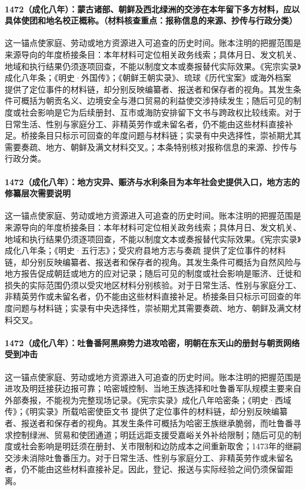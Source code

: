 \paragraph{1472（成化八年）：蒙古诸部、朝鲜及西北绿洲的交涉在本年留下多方材料，应以具体使团和地名校正概称。（材料核查重点：报称信息的来源、抄传与行政分类）} 这一锚点使家庭、劳动或地方资源进入可追查的历史时间。账本注明的把握范围是来源导向的年度桥接条目：本年材料可定位相关政务线索；具体月日、发文机关、地域和执行结果仍须逐项回查，不能以制度文本或奏报替代实际效果。《宪宗实录》成化八年条；《明史·外国传》；《朝鲜王朝实录》、琉球《历代宝案》或海外档案 提供了定位事件的材料链，却分别反映编纂者、报送者和保存者的视角。其发生条件可概括为朝贡名义、边境安全与港口贸易的利益使交涉持续发生；随后可见的制度或社会影响是它为后续册封、互市或海防安排留下文书与跨政权比较线索。对于日常生活、性别与家庭分工、非精英劳作或未留名者，仍不能由这些材料直接补足。桥接条目只标示可回查的年度问题与材料链；实录有中央选择性，崇祯期尤其需要奏疏、地方、朝鲜及满文材料交叉。；本条特别核对报称信息的来源、抄传与行政分类。

\paragraph{1472（成化八年）：地方灾异、赈济与水利条目为本年社会史提供入口，地方志的修纂层次需要说明} 这一锚点使家庭、劳动或地方资源进入可追查的历史时间。账本注明的把握范围是来源导向的年度桥接条目：本年材料可定位相关政务线索；具体月日、发文机关、地域和执行结果仍须逐项回查，不能以制度文本或奏报替代实际效果。《宪宗实录》成化八年条；《明史·五行志》；受灾府县地方志与奏疏 提供了定位事件的材料链，却分别反映编纂者、报送者和保存者的视角。其发生条件可概括为自然风险与地方报告促成朝廷或地方的应对记录；随后可见的制度或社会影响是赈济、迁徙和损失的实际范围仍须以受灾地区材料分别核验。对于日常生活、性别与家庭分工、非精英劳作或未留名者，仍不能由这些材料直接补足。桥接条目只标示可回查的年度问题与材料链；实录有中央选择性，崇祯期尤其需要奏疏、地方、朝鲜及满文材料交叉。

\paragraph{1472（成化八年）：吐鲁番阿黑麻势力进攻哈密，明朝在东天山的册封与朝贡网络受到冲击} 这一锚点使家庭、劳动或地方资源进入可追查的历史时间。账本注明的把握范围是进攻及明廷接获边报可靠；哈密城控制、当地王族选择和吐鲁番军队规模主要来自外部奏报，不能视为完整现场记录。《宪宗实录》成化八年哈密条；《明史·西域传》；《明实录》所载哈密使臣文书 提供了定位事件的材料链，却分别反映编纂者、报送者和保存者的视角。其发生条件可概括为哈密王族继承脆弱，而吐鲁番寻求控制绿洲、贸易和使团通道；明廷远距支援受嘉峪关外补给限制；随后可见的制度或社会影响是明廷须在册封、关市限制和边防成本之间重新取舍；1473年的继嗣交涉未消除吐鲁番压力。对于日常生活、性别与家庭分工、非精英劳作或未留名者，仍不能由这些材料直接补足。因此，登记、报送与实际经验之间仍须保留距离。


